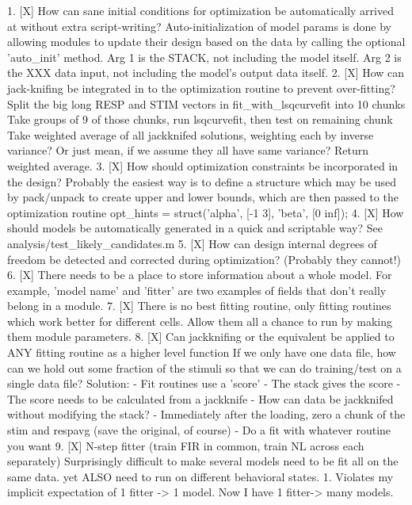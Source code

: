   1. [X] How can sane initial conditions for optimization be automatically arrived at without extra script-writing?
	 Auto-initialization of model params is done by allowing modules to update their design based on the data by calling the optional 'auto_init' method.
	 Arg 1 is the STACK, not including the model itself. 
	 Arg 2 is the XXX data input, not including the model's output data itself. 
  2. [X] How can jack-knifing be integrated in to the optimization routine to prevent over-fitting?
	 Split the big long RESP and STIM vectors in fit_with_lsqcurvefit into 10 chunks
	 Take groups of 9 of those chunks, run lsqcurvefit, then test on remaining chunk
	 Take weighted average of all jackknifed solutions, weighting each by inverse variance? Or just mean, if we assume they all have same variance?
	 Return weighted average.
  3. [X] How should optimization constraints be incorporated in the design?
	 Probably the easiest way is to define a structure which may be used by pack/unpack to create upper and lower bounds, which are then passed to the optimization routine
	 opt_hints = struct('alpha', [-1 3], 'beta', [0 inf]); %
  4. [X] How should models be automatically generated in a quick and scriptable way?
	 See analysis/test_likely_candidates.m
  5. [X] How can design internal degrees of freedom be detected and corrected during optimization?
	 (Probably they cannot!)
  6. [X] There needs to be a place to store information about a whole model. 
	 For example, 'model name' and 'fitter' are two examples of fields that don't really belong in a module.
  7. [X] There is no best fitting routine, only fitting routines which work better for different cells. Allow them all a chance to run by making them module parameters.
  8. [X] Can jackknifing or the equivalent be applied to ANY fitting routine as a higher level function
	 If we only have one data file, how can we hold out some fraction of the stimuli so that we can do training/test on a single data file?
	 Solution:
	 - Fit routines use a 'score'
	 - The stack gives the score
	 - The score needs to be calculated from a jackknife
	 - How can data be jackknifed without modifying the stack?
	 - Immediately after the loading, zero a chunk of the stim and respavg (save the original, of course)
	 - Do a fit with whatever routine you want
  9. [X] N-step fitter (train FIR in common, train NL across each separately)
	 Surprisingly difficult to make several models need to be fit all on the same data. yet ALSO need to run on different behavioral states. 
         1. Violates my implicit expectation of 1 fitter -> 1 model. Now I have 1 fitter-> many models.
